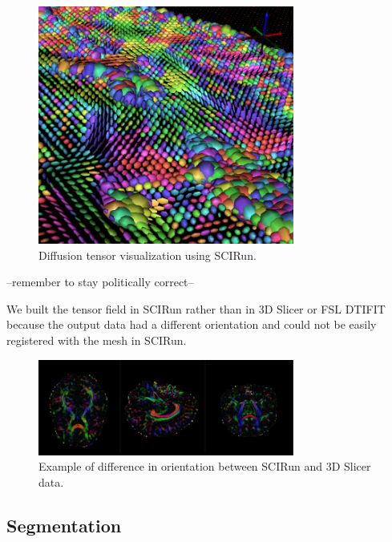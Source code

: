 \begin{figure}[H]
\begin{center}
\includegraphics[width=0.75\textwidth]{Figures/DTI_2.png}
\caption{Diffusion tensor visualization using SCIRun.}
\label{fig:tensorvis2}
\end{center}
\end{figure}

--remember to stay politically correct--
 
We built the tensor field in SCIRun rather than in 3D Slicer \cite{ref:slicer} or FSL DTIFIT because the output data had a different orientation and could not be easily registered with the mesh in SCIRun.

\begin{figure}[H]
\begin{center}
\includegraphics[width=0.75\textwidth]{Figures/backwards.png}
\caption{Example of difference in orientation between SCIRun and 3D
  Slicer data.}
\label{fig:backwards}
\end{center}
\end{figure}

\subsection{Segmentation}

